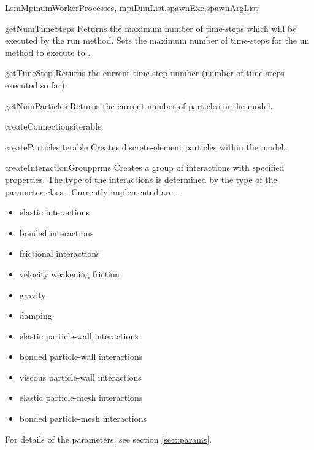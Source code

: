 \documentclass{manual}
\begin{document}
\begin{classdesc}{LsmMpi}{numWorkerProcesses, mpiDimList,spawnExe,spawnArgList}
\begin{methoddesc}{getNumTimeSteps}{}
Returns the maximum number of time-steps which will be executed by the {\sf run} method.
Sets the maximum number of time-steps for the {\sf un} method to execute to . 
\end{methoddesc}

\begin{methoddesc}{getTimeStep}{}
Returns the current time-step number (number of time-steps executed so far).
\end{methoddesc}


\begin{methoddesc}{getNumParticles}{}
Returns the current number of particles in the model.
\end{methoddesc}

\begin{methoddesc}{createConnections}{iterable}
\end{methoddesc}

\begin{methoddesc}{createParticles}{iterable}
Creates discrete-element particles within the model.
\end{methoddesc}

\begin{methoddesc}{createInteractionGroup}{prms}
Creates a group of interactions with specified properties. The type of the interactions is determined by the type of the parameter class . Currently implemented are :
\begin{itemize}
\item elastic interactions 
\item bonded interactions
\item frictional interactions
\item velocity weakening friction
\item gravity
\item damping 
\item elastic particle-wall interactions
\item bonded particle-wall interactions
\item viscous particle-wall interactions
\item elastic particle-mesh interactions
\item bonded particle-mesh interactions
\end{itemize}
For details of the parameters, see section \ref{sec::params}.
\end{methoddesc}



\end{classdesc}
\end{document}
